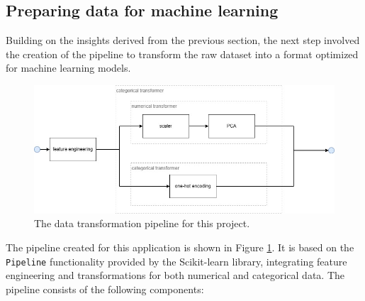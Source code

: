 

\subsection{Preparing data for machine learning}

Building on the insights derived from the previous section, the next step involved the creation of the pipeline to transform the raw dataset into a format optimized for machine learning models.

\begin{figure}[H]
	\centering
	\includegraphics[width=0.7\linewidth]{img/pipeline}
	\caption{The data transformation pipeline for this project.}
	\label{fig:pipeline}
\end{figure}

The pipeline created for this application is shown in Figure \ref{fig:pipeline}. It is based on the \texttt{Pipeline} functionality provided by the Scikit-learn library, integrating feature engineering and transformations for both numerical and categorical data. The pipeline consists of the following components:

